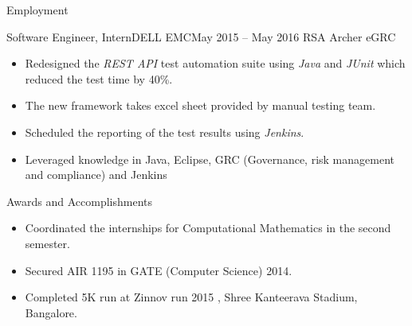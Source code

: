 \documentclass[]{mcdowellcv}
\begin{document}
\begin{cvsection}{Employment}
		\begin{cvsubsection}{Software Engineer, Intern}{DELL EMC}{May 2015 – May 2016}
			RSA Archer eGRC		
			\begin{itemize}
				\item Redesigned the \textit{REST API} test automation suite using \textit{Java} and \textit{JUnit} which reduced the test time by 40\%.
				\item The new framework takes excel sheet provided by manual testing team.
				\item Scheduled the reporting of the test results using \textit{Jenkins}.
				\item Leveraged knowledge in Java, Eclipse, GRC (Governance, risk management and compliance) and Jenkins
			\end{itemize}
		\end{cvsubsection}
	\end{cvsection}
	
	\begin{cvsection}{Awards and Accomplishments}
		\begin{cvsubsection}{}{}{}	
			\begin{itemize}
			\item Coordinated the internships for Computational Mathematics in the second semester.
			\item Secured AIR 1195 in GATE (Computer Science) 2014.
            \item Completed 5K run at Zinnov run 2015 , Shree Kanteerava Stadium, Bangalore.
			\end{itemize}
		\end{cvsubsection}
	\end{cvsection}
	
\end{document}
